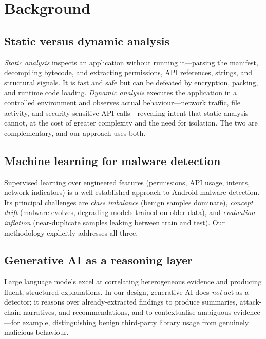 \documentclass[11pt,a4paper]{article}
\begin{document}
\section{Background}
\subsection{Static versus dynamic analysis}
\emph{Static analysis} inspects an application without running it---parsing the manifest,
decompiling bytecode, and extracting permissions, API references, strings, and structural
signals. It is fast and safe but can be defeated by encryption, packing, and runtime code
loading. \emph{Dynamic analysis} executes the application in a controlled environment and
observes actual behaviour---network traffic, file activity, and security-sensitive API
calls---revealing intent that static analysis cannot, at the cost of greater complexity
and the need for isolation. The two are complementary, and our approach uses both.

\subsection{Machine learning for malware detection}
Supervised learning over engineered features (permissions, API usage, intents, network
indicators) is a well-established approach to Android-malware detection. Its principal
challenges are \emph{class imbalance} (benign samples dominate), \emph{concept drift}
(malware evolves, degrading models trained on older data), and \emph{evaluation inflation}
(near-duplicate samples leaking between train and test). Our methodology explicitly
addresses all three.

\subsection{Generative AI as a reasoning layer}
Large language models excel at correlating heterogeneous evidence and producing fluent,
structured explanations. In our design, generative AI does \emph{not} act as a detector;
it reasons over already-extracted findings to produce summaries, attack-chain narratives,
and recommendations, and to contextualise ambiguous evidence---for example, distinguishing
benign third-party library usage from genuinely malicious behaviour.

\end{document}
